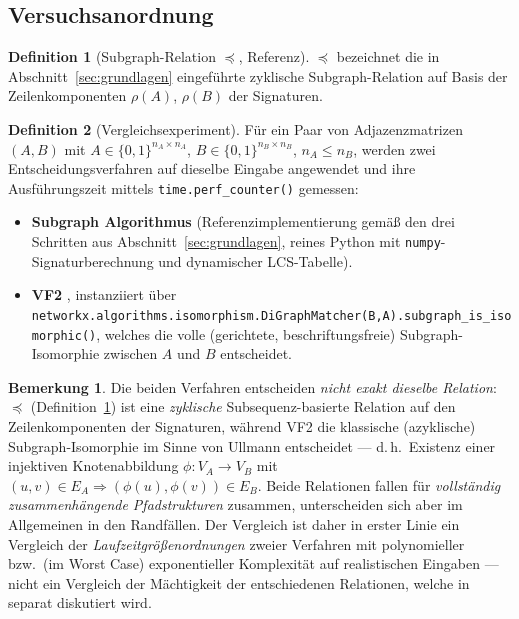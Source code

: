 \documentclass[a4paper,12pt]{article}
\theoremstyle{definition}
\newtheorem{definition}{Definition}
\newtheorem{bemerkung}{Bemerkung}
\begin{document}
\subsection{Versuchsanordnung}

\begin{definition}[Subgraph-Relation $\preceq$, Referenz]
	\label{def:subgraphrelation_ref}
	$\preceq$ bezeichnet die in Abschnitt~\ref{sec:grundlagen} eingeführte zyklische Subgraph-Relation auf Basis der Zeilenkomponenten $\rho(A)$, $\rho(B)$ der Signaturen.
\end{definition}

\begin{definition}[Vergleichsexperiment]
	\label{def:vergleich}
	Für ein Paar von Adjazenzmatrizen $(A,B)$ mit $A\in\{0,1\}^{n_A\times n_A}$, $B\in\{0,1\}^{n_B\times n_B}$, $n_A\le n_B$, werden zwei Entscheidungsverfahren auf dieselbe Eingabe angewendet und ihre Ausführungszeit mittels \texttt{time.perf\_counter()} gemessen:
	\begin{itemize}
		\item \textbf{Subgraph Algorithmus} (Referenzimplementierung gemäß den drei Schritten aus Abschnitt~\ref{sec:grundlagen}, reines Python mit \texttt{numpy}-Signaturberechnung und dynamischer LCS-Tabelle).
		\item \textbf{VF2} \cite{cordella2004}, instanziiert über \texttt{networkx.algorithms.\allowbreak isomorphism.DiGraphMatcher(B,A).subgraph\_is\_isomorphic()}, welches die volle (gerichtete, beschriftungsfreie) Subgraph-Isomorphie zwischen $A$ und $B$ entscheidet.
	\end{itemize}
\end{definition}

\begin{bemerkung}
	Die beiden Verfahren entscheiden \emph{nicht exakt dieselbe Relation}: $\preceq$ (Definition~\ref{def:subgraphrelation_ref}) ist eine \emph{zyklische} Subsequenz-basierte Relation auf den Zeilenkomponenten der Signaturen, während VF2 die klassische (azyklische) Subgraph-Isomorphie im Sinne von Ullmann \cite{ullmann1976} entscheidet — d.\,h.\ Existenz einer injektiven Knotenabbildung $\phi:V_A\to V_B$ mit $(u,v)\in E_A\Rightarrow(\phi(u),\phi(v))\in E_B$. Beide Relationen fallen für \emph{vollständig zusammenhängende Pfadstrukturen} zusammen, unterscheiden sich aber im Allgemeinen in den Randfällen. Der Vergleich ist daher in erster Linie ein Vergleich der \emph{Laufzeitgrößenordnungen} zweier Verfahren mit polynomieller bzw.\ (im Worst Case) exponentieller Komplexität auf realistischen Eingaben — nicht ein Vergleich der Mächtigkeit der entschiedenen Relationen, welche in \cite{epp2026subgraph} separat diskutiert wird.
\end{bemerkung}
\end{document}
